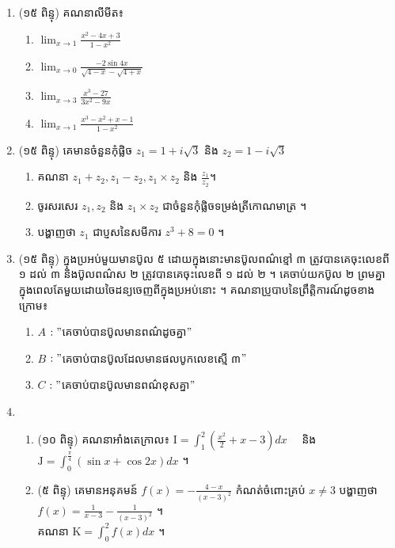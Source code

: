 \documentclass{officialexam}
\begin{document}
	{\maketitle}
	\begin{enumerate}[I]
		\item {\color{khtug}(១៥ ពិន្ទុ)} គណនាលីមីត៖
		\begin{enumerate}[k,4]
			\item $\lim_{x\to1}\frac{x^2-4x+3}{1-x^2}$
			\item $\lim_{x\to0}\frac{-2\sin4x}{\sqrt{4-x}-\sqrt{4+x}}$
			\item $\lim_{x\to3}\frac{x^3-27}{3x^2-9x}$
			\item $\lim_{x\to1}\frac{x^3-x^2+x-1}{1-x^2}$
		\end{enumerate}
		\item {\color{khtug}(១៥ ពិន្ទុ)} គេមានចំនួនកុំផ្លិច $z_1=1+i\sqrt{3}$ និង $z_2=1-i\sqrt{3}$
		\begin{enumerate}[k]
			\item គណនា $z_1+z_2, z_1-z_2, z_1\times z_2$ និង $\frac{z_1}{z_2}$។
			\item ចូរសរសេរ $z_1, z_2$ និង $z_1\times z_2$ ជាចំនួនកុំផ្លិចទម្រង់ត្រីកោណមាត្រ ។ 
			\item បង្ហាញថា $z_1$ ជាប្ញសនៃសមីការ $z^3+8=0$ ។ 
		\end{enumerate}
		\item {\color{khtug}(១៥ ពិន្ទុ)} ក្នុងប្រអប់មួយមានប៊ូល ៥ ដោយក្នុងនោះមានប៊ូលពណ៌ខ្មៅ ៣ ត្រូវបានគេចុះលេខពី ១ ដល់ ៣ និងប៊ូលពណ៌ស ២ ត្រូវបានគេចុះលេខពី ១ ដល់ ២ ។ គេចាប់យកប៊ូល ២ ព្រមគ្នាក្នុងពេលតែមួយដោយចៃដន្យចេញពីក្នុងប្រអប់នោះ ។ គណនាប្រូបាបនៃព្រឹត្តិការណ៍ដូចខាងក្រោម៖ 
		\begin{enumerate}[k]
			\item $A$ $ :"$គេចាប់បានប៊ូលមានពណ៌ដូចគ្នា$"$
			\item $B$ $ :"$គេចាប់បានប៊ូលដែលមានផលបូកលេខស្មើ ៣$"$ 
			\item $C$ $ :"$គេចាប់បានប៊ូលមានពណ៌ខុសគ្នា$"$ 
		\end{enumerate}
		\item \begin{enumerate}[1]
			\item {\color{khtug}(១០ ពិន្ទុ)} គណនាអាំងតេក្រាល៖ $\mathrm{I}=\int_{1}^{2}\left(\frac{x^2}{2}+x-3\right)dx$ ~~និង $\mathrm{J}=\int_{0}^{\frac{\pi}{4}}\left(\sin x+\cos2x\right)dx$ ។
			\item {\color{khtug}(៥ ពិន្ទុ)} គេមានអនុគមន៍ $f(x)=-\frac{4-x}{\left(x-3\right)^2}$ កំណត់ចំពោះគ្រប់ $x\neq3$ បង្ហាញថា $f(x)=\frac{1}{x-3}-\frac{1}{\left(x-3\right)^2}$ ។\\ គណនា $\mathrm{K}=\int_{0}^{2}f(x)dx$ ។ 

\end{enumerate}
\end{enumerate}
\end{document}
